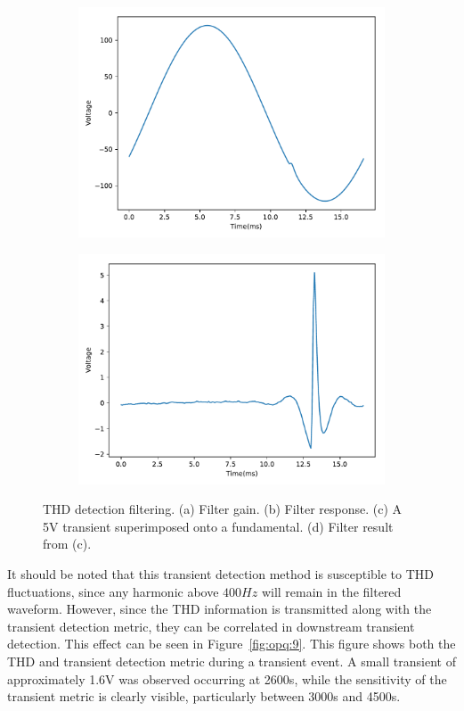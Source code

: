 \begin{figure}[ht]
	\begin{subfigure}{.5\textwidth}
		\centering
		\includegraphics[width=0.86\linewidth]{images/opq-box/box_eval/5v_transient.pdf}
		\caption{}
		\label{fig:opq:8:3}
	\end{subfigure}%
	\begin{subfigure}{.5\textwidth}
		\centering
		\includegraphics[width=0.86\linewidth]{images/opq-box/box_eval/5v_transient_filtered.pdf}
		\caption{}
		\label{fig:opq:8:4}
	\end{subfigure}
	\caption{THD detection filtering. (a) Filter gain. (b) Filter response. (c) A 5V transient superimposed onto a fundamental. (d) Filter result from (c).}
	\label{fig:opq:8}
\end{figure}

It should be noted that this transient detection method is susceptible to THD fluctuations, since any harmonic above $400Hz$ will remain in the filtered waveform.
However, since the THD information is transmitted along with the transient detection metric, they can be correlated in downstream transient detection.
This effect can be seen in Figure~\ref{fig:opq:9}.
This figure shows both the THD and transient detection metric during a transient event.
A small transient of approximately 1.6V was observed occurring at 2600s, while the sensitivity of the transient metric is clearly visible, particularly between 3000s and 4500s.

